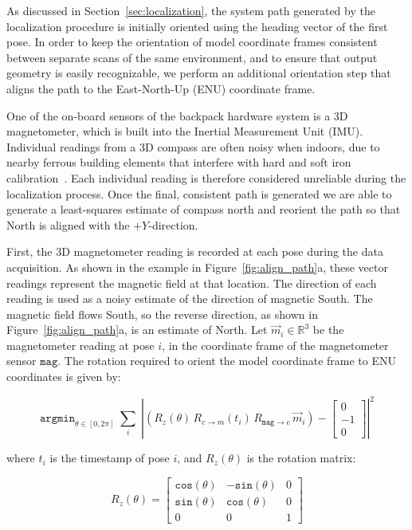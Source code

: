 \documentclass[12pt,onecolumn,oneside]{book}
\begin{document}
As discussed in Section~\ref{sec:localization}, the system path generated by the localization procedure is initially oriented using the heading vector of the first pose.  In order to keep the orientation of model coordinate frames consistent between separate scans of the same environment, and to ensure that output geometry is easily recognizable, we perform an additional orientation step that aligns the path to the East-North-Up (ENU) coordinate frame.

One of the on-board sensors of the backpack hardware system is a 3D magnetometer, which is built into the Inertial Measurement Unit (IMU).  Individual readings from a 3D compass are often noisy when indoors, due to nearby ferrous building elements that interfere with hard and soft iron calibration~\cite{Caruso00,Guo08}.  Each individual reading is therefore considered unreliable during the localization process.  Once the final, consistent path is generated we are able to generate a least-squares estimate of compass north and reorient the path so that North is aligned with the $+Y$-direction.

First, the 3D magnetometer reading is recorded at each pose during the data acquisition.  As shown in the example in Figure~\ref{fig:align_path}a, these vector readings represent the magnetic field at that location.  The direction of each reading is used as a noisy estimate of the direction of magnetic South.  The magnetic field flows South, so the reverse direction, as shown in Figure~\ref{fig:align_path}a, is an estimate of North.  Let $\vec{m}_i \in \mathbb{R}^3$ be the magnetometer reading at pose $i$, in the coordinate frame of the magnetometer sensor $\texttt{mag}$.  The rotation required to orient the model coordinate frame to ENU coordinates is given by:

\begin{equation}
	\label{eq:align_path}
	\texttt{argmin}_{\theta \in [0,2\pi]} \; \sum \limits_{i} 
		\; \left| \left( R_{z}(\theta) \, R_{c\rightarrow m} (t_i) \,
			R_{\texttt{mag} \rightarrow c} \, \vec{m}_i \right) - \left[ 
				\begin{array}{c} 0 \\ -1 \\ 0 \end{array} 
					\right] \right|^2
\end{equation}

where $t_i$ is the timestamp of pose $i$, and $R_{z}(\theta)$ is the rotation matrix:

\begin{equation}
	\label{eq:rotation_matrix}
	R_{z}(\theta) = \left[ \begin{array}{ccc}
				\texttt{cos}(\theta) & -\texttt{sin}(\theta) & 0 \\
				\texttt{sin}(\theta) & \texttt{cos}(\theta) & 0 \\
				0 & 0 & 1 \end{array} \right]
\end{equation}
\end{document}
